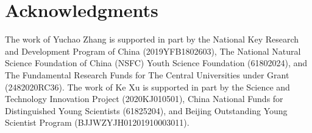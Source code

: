 \section*{Acknowledgments}

The work of Yuchao Zhang is supported in part by the National Key Research and Development Program of China (2019YFB1802603), The National Natural Science Foundation of China (NSFC) Youth Science Foundation (61802024), and The Fundamental Research Funds for The Central Universities under Grant (2482020RC36). The work of Ke Xu is supported in part by the Science and Technology Innovation Project (2020KJ010501), China National Funds for Distinguished Young Scientists (61825204), and Beijing Outstanding Young Scientist Program (BJJWZYJH01201910003011). 